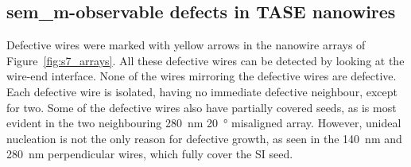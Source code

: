 \subsection{\texorpdfstring{\acs{sem_m}-observable defects in \acs{TASE} nanowires}{SEM observable defects in TASE nanowires}}

Defective wires were marked with yellow arrows in the nanowire arrays of Figure~\ref{fig:s7_arrays}. All these defective wires can be detected by looking at the wire-end interface. None of the wires mirroring the defective wires are defective. Each defective wire is isolated, having no immediate defective neighbour, except for two. Some of the defective wires also have partially covered seeds, as is most evident in the two neighbouring \qty{280}{\nano\metre} \qty{20}{\degree} misaligned array. However, unideal nucleation is not the only reason for defective growth, as seen in the \qty{140}{\nano\metre} and \qty{280}{\nano\metre} perpendicular wires, which fully cover the \acl{SI} seed.

